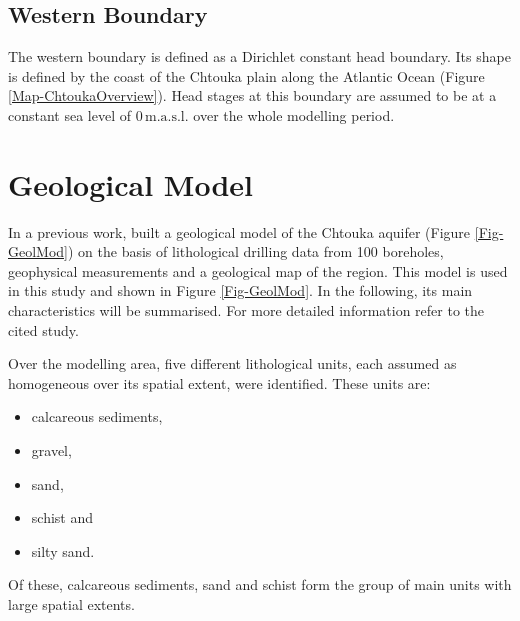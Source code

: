 \subsection{Western Boundary}

The western boundary is defined as a Dirichlet constant head boundary. 
Its shape is defined by the coast of the Chtouka plain along the Atlantic Ocean (Figure \ref{Map-ChtoukaOverview}). 
Head stages at this boundary are assumed to be at a constant sea level of $0 \, \textrm{m.a.s.l.}$ over the whole modelling period.


\section{Geological Model}
\label{Sec-GeolModel}

In a previous work, \textcite{Horn.2021} built a geological model of the Chtouka aquifer (Figure \ref{Fig-GeolMod}) on the basis of lithological drilling data from 100 boreholes, geophysical measurements and a geological map of the region. 
This model is used in this study and shown in Figure \ref{Fig-GeolMod}. 
In the following, its main characteristics will be summarised. 
For more detailed information refer to the cited study.

Over the modelling area, five different lithological units, each assumed as homogeneous over its spatial extent, were identified. 
These units are:

\begin{itemize}
    \item calcareous sediments,
    \item gravel,
    \item sand,
    \item schist and
    \item silty sand.
\end{itemize}

Of these, calcareous sediments, sand and schist form the group of main units with large spatial extents. 

